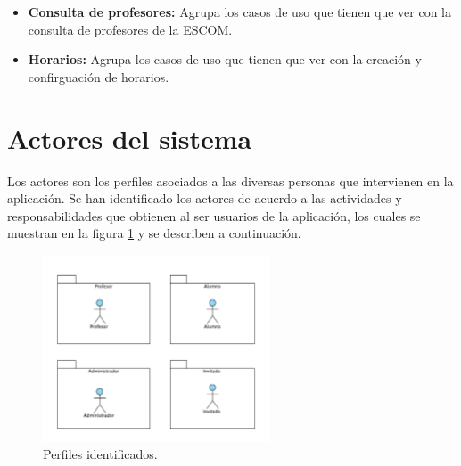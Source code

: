     \begin{itemize}
	\item {\bf Consulta de profesores:} Agrupa los casos de uso que tienen que ver con la consulta de profesores de la ESCOM. 

	
	\item {\bf Horarios:} Agrupa los casos de uso que tienen que ver con la creación y confirguación de horarios.
%	
    \end{itemize}

\section{Actores del sistema}\label{sec:Comportamiento:ActoresSistema}

Los actores son los perfiles asociados a las diversas personas que intervienen en la aplicación. Se han identificado los actores de acuerdo a las actividades y responsabilidades que obtienen al ser usuarios de la aplicación, los cuales se muestran en la figura \ref{fig:perfilesPAEAR} y se describen a continuación.

    \begin{figure}[h!]
      \begin{center}
	  \includegraphics[width=0.6\textwidth]{images/Diagrama_Actores}
      \caption{Perfiles identificados.}
      \label{fig:perfilesPAEAR}
      \end{center}
    \end{figure}

